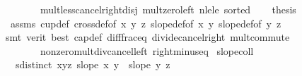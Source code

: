 \begin{isabellebody}
\ \ \ \ \ \ \ \ mult{\isacharunderscore}{\kern0pt}less{\isacharunderscore}{\kern0pt}cancel{\isacharunderscore}{\kern0pt}right{\isacharunderscore}{\kern0pt}disj\ mult{\isacharunderscore}{\kern0pt}zero{\isacharunderscore}{\kern0pt}left\ nle{\isacharunderscore}{\kern0pt}le\ sorted{}{\isacharparenright}{\kern0pt}\isanewline
\ \ \isamarkupfalse%
\ {\isacharquery}{\kern0pt}thesis\isanewline
\ \ \ \ \isamarkupfalse%
\ {}\ assms{\isacharparenleft}{\kern0pt}{}{\isacharparenright}{\kern0pt}\ cup{}{\isacharunderscore}{\kern0pt}def\ cross{}{\isacharunderscore}{\kern0pt}def{\isacharbrackleft}{\kern0pt}of\ {\isachardoublequoteopen}x{\isachardoublequoteclose}\ {\isachardoublequoteopen}y{\isachardoublequoteclose}\ {\isachardoublequoteopen}z{\isachardoublequoteclose}{\isacharbrackright}{\kern0pt}\ slope{\isacharunderscore}{\kern0pt}def{\isacharbrackleft}{\kern0pt}of\ {\isachardoublequoteopen}x{\isachardoublequoteclose}\ {\isachardoublequoteopen}y{\isachardoublequoteclose}{\isacharbrackright}{\kern0pt}\ slope{\isacharunderscore}{\kern0pt}def{\isacharbrackleft}{\kern0pt}of\ {\isachardoublequoteopen}y{\isachardoublequoteclose}\ {\isachardoublequoteopen}z{\isachardoublequoteclose}{\isacharbrackright}{\kern0pt}\isanewline
\ \ \ \ \isamarkupfalse%
\ {\isacharparenleft}{\kern0pt}smt\ {\isacharparenleft}{\kern0pt}verit{\isacharcomma}{\kern0pt}\ best{\isacharparenright}{\kern0pt}\ cap{}{\isacharunderscore}{\kern0pt}def\ diff{\isacharunderscore}{\kern0pt}frac{\isacharunderscore}{\kern0pt}eq\ divide{\isacharunderscore}{\kern0pt}cancel{\isacharunderscore}{\kern0pt}right\ mult{\isachardot}{\kern0pt}commute\isanewline
\ \ \ \ \ \ \ \ nonzero{\isacharunderscore}{\kern0pt}mult{\isacharunderscore}{\kern0pt}div{\isacharunderscore}{\kern0pt}cancel{\isacharunderscore}{\kern0pt}left\ right{\isacharunderscore}{\kern0pt}minus{\isacharunderscore}{\kern0pt}eq{\isacharparenright}{\kern0pt}\isanewline
{}\isamarkupfalse%
%
\endisatagproof
{\isafoldproof}%
%
\isadelimproof
\isanewline
%
\endisadelimproof
\isanewline
{}\isamarkupfalse%
\ slope{\isacharunderscore}{\kern0pt}coll{}{\isacharcolon}{\kern0pt}\isanewline
\ \ \ {\isachardoublequoteopen}sdistinct\ {\isacharbrackleft}{\kern0pt}x{\isacharcomma}{\kern0pt}y{\isacharcomma}{\kern0pt}z{\isacharbrackright}{\kern0pt}{\isachardoublequoteclose}\ {\isachardoublequoteopen}slope\ x\ y\ {\isacharequal}{\kern0pt}\ slope\ y\ z{\isachardoublequoteclose}\isanewline

\end{isabellebody}
